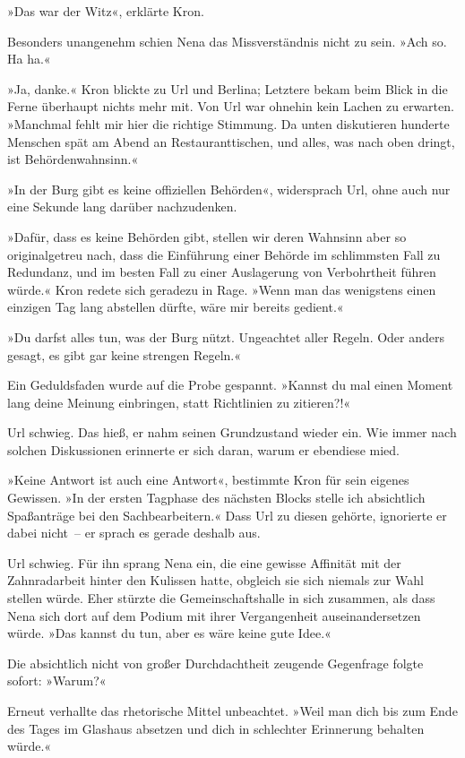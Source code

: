 »Das war der Witz«, erklärte Kron.

Besonders unangenehm schien Nena das Missverständnis nicht zu sein. »Ach so. Ha ha.«

»Ja, danke.« Kron blickte zu Url und Berlina; Letztere bekam beim Blick in die Ferne überhaupt nichts mehr mit. Von Url war ohnehin kein Lachen zu erwarten. »Manchmal fehlt mir hier die richtige Stimmung. Da unten diskutieren hunderte Menschen spät am Abend an Restauranttischen, und alles, was nach oben dringt, ist Behördenwahnsinn.«

»In der Burg gibt es keine offiziellen Behörden«, widersprach Url, ohne auch nur eine Sekunde lang darüber nachzudenken.

»Dafür, dass es keine Behörden gibt, stellen wir deren Wahnsinn aber so originalgetreu nach, dass die Einführung einer Behörde im schlimmsten Fall zu Redundanz, und im besten Fall zu einer Auslagerung von Verbohrtheit führen würde.« Kron redete sich geradezu in Rage. »Wenn man das wenigstens einen einzigen Tag lang abstellen dürfte, wäre mir bereits gedient.«

»Du darfst alles tun, was der Burg nützt. Ungeachtet aller Regeln. Oder anders gesagt, es gibt gar keine strengen Regeln.«

Ein Geduldsfaden wurde auf die Probe gespannt. »Kannst du mal einen Moment lang deine Meinung einbringen, statt Richtlinien zu zitieren?!«

Url schwieg. Das hieß, er nahm seinen Grundzustand wieder ein. Wie immer nach solchen Diskussionen erinnerte er sich daran, warum er ebendiese mied.

»Keine Antwort ist auch eine Antwort«, bestimmte Kron für sein eigenes Gewissen. »In der ersten Tagphase des nächsten Blocks stelle ich absichtlich Spaßanträge bei den Sachbearbeitern.« Dass Url zu diesen gehörte, ignorierte er dabei nicht~– er sprach es gerade deshalb aus.

Url schwieg. Für ihn sprang Nena ein, die eine gewisse Affinität mit der Zahnradarbeit hinter den Kulissen hatte, obgleich sie sich niemals zur Wahl stellen würde. Eher stürzte die Gemeinschaftshalle in sich zusammen, als dass Nena sich dort auf dem Podium mit ihrer Vergangenheit auseinandersetzen würde. »Das kannst du tun, aber es wäre keine gute Idee.«

Die absichtlich nicht von großer Durchdachtheit zeugende Gegenfrage folgte sofort: »Warum?«

Erneut verhallte das rhetorische Mittel unbeachtet. »Weil man dich bis zum Ende des Tages im Glashaus absetzen und dich in schlechter Erinnerung behalten würde.«

